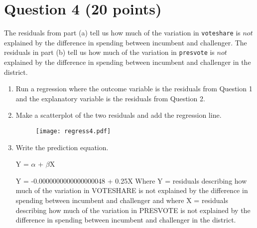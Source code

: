 \documentclass[12pt,letterpaper]{article}
\begin{document}
\section*{Question 4 (20 points)}
\noindent The residuals from part (a) tell us how much of the variation in \texttt{voteshare} is $not$ explained by the difference in spending between incumbent and challenger. The residuals in part (b) tell us how much of the variation in \texttt{presvote} is $not$ explained by the difference in spending between incumbent and challenger in the district.
	\begin{enumerate}
		\item Run a regression where the outcome variable is the residuals from Question 1 and the explanatory variable is the residuals from Question 2.
		 
		\vspace{.25cm} 
			
		\item Make a scatterplot of the two residuals and add the regression line. 
		 
		
		\begin{figure}[h!]\centering
		\caption{\footnotesize }
		\label{fig:plot_1}
		\texttt{[image: regress4.pdf]}
		\end{figure}
		\vspace{.25cm}
		
		\newpage
		
		\item Write the prediction equation.
		
		Y = $\alpha$ + $\beta$X 
		
		\vspace{.1cm}
		
		Y = -0.0000000000000000048 + 0.25X
		Where Y = residuals describing how much of the variation in VOTESHARE is not explained by the difference in spending between incumbent and challenger
		and where X = residuals describing how much of the variation in PRESVOTE is not explained by the difference in spending between incumbent and challenger in the district.
	\end{enumerate}
	
	\vspace{1cm}
\end{document}
